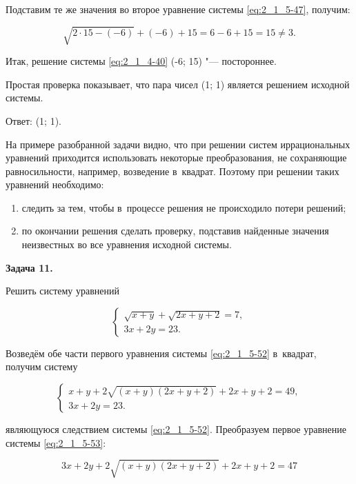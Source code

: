Подставим те же значения во второе уравнение системы \eqref{eq:2_1_5-47}, получим:

\begin{equation*}
\sqrt{2 \cdot 15 - (-6)} + (-6) + 15 = 6 - 6 + 15 = 15 \ne 3.
\end{equation*}

\noindent
Итак, решение системы \eqref{eq:2_1_4-40} (-6; 15) "--- постороннее.

Простая проверка показывает, что пара чисел (1; 1) является решением исходной
системы.

Ответ: (1; 1).

На примере разобранной задачи видно, что при решении систем иррациональных
уравнений приходится использовать некоторые преобразования, не сохраняющие
равносильности, например, возведение в~квадрат. Поэтому при решении таких
уравнений необходимо:

\begin{enumerate}
\item следить за тем, чтобы в~процессе решения не происходило потери решений;
\item по окончании решения сделать проверку, подставив найденные значения
неизвестных во все уравнения исходной системы.
\end{enumerate}

\hypertarget{ex:2_1_5_10}{\textbf{Задача 11.}} Решить систему уравнений

\begin{equation}\label{eq:2_1_5-52}
\begin{cases}
\sqrt{x + y} + \sqrt{2x + y + 2} = 7, \\
3x + 2y = 23.
\end{cases}
\end{equation}

Возведём обе части первого уравнения системы \eqref{eq:2_1_5-52} в~квадрат,
получим систему

\begin{equation}\label{eq:2_1_5-53}
\begin{cases}
x + y + 2\sqrt{(x + y)(2x + y + 2)} + 2x + y + 2 = 49, \\
3x + 2y = 23.
\end{cases}
\end{equation}

\noindent
являющуюся следствием системы \eqref{eq:2_1_5-52}.
Преобразуем первое уравнение системы \eqref{eq:2_1_5-53}:

\begin{equation*}
3x + 2y + 2\sqrt{(x + y)(2x + y + 2)} + 2x + y + 2 = 47
\end{equation*}

